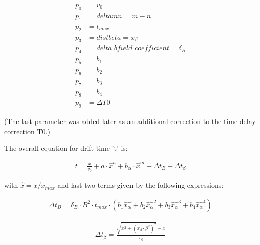 \documentclass[12pt,epsfig]{article}
\begin{document}
\begin{equation}
\label{freePars}
\begin{aligned}
  p_0 & = v_0 \\
  p_1 & = deltamn = m - n  \\ %
  p_2 & = t_{max}   \\
  p_3 & = distbeta = x_{\beta} \\ 
  p_4 & = delta\_bfield\_coefficient = \delta_{B} \\
  p_5 & = b_1  \\
  p_6 & = b_2  \\
  p_7 & = b_3  \\
  p_8 & = b_4 \\
  p_9 & = \Delta T0
\end{aligned}
\end{equation}

(The last parameter was added later as an additional correction to the time-delay correction T0.)

The overall equation for drift time 't' is:

\begin{equation}
\label{timeAll}
\begin{aligned}
     t = \frac{x}{v_0} + a \cdot \hat{x}^n + b_{\alpha}\cdot \hat{x}^m + \Delta t_{B} + \Delta t_{\beta}
\end{aligned}
\end{equation}

with $\hat{x} = x / x_{max}$ and last two terms given by the following expressions:

\begin{equation}
\label{Delta_t_B}
\begin{aligned}
  \Delta t_{B} = \delta_{B} \cdot B^2 \cdot t_{max} \cdot
            (b_1 \hat{x_{\alpha}} + b_2 \hat{x_{\alpha}}^2 + b_3 \hat{x_{\alpha}}^3 + b_4 \hat{x_{\alpha}}^4  )
\end{aligned}
\end{equation}

\begin{equation}
\label{Delta_t_beta}
\begin{aligned}
     \Delta t_{\beta} = \frac{ \sqrt{x^2 + (x_{\beta} \cdot \beta^2)^2} - x }{ v_0 }
\end{aligned}
\end{equation}
\end{document}
